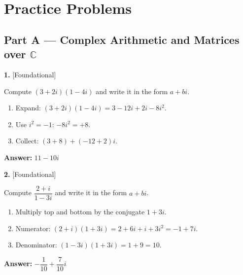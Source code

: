 \documentclass[11pt]{article}
\begin{document}
\section*{\large\color{ink} Practice Problems}
\subsection*{\normalsize\color{ink} Part A --- Complex Arithmetic and Matrices over $\mathbb{C}$}
\begin{minipage}{\linewidth}\textbf{1.} \hfill{\scriptsize\color{ink}[Foundational]}\par\nopagebreak Compute $(3+2i)(1-4i)$ and write it in the form $a+bi$.
\end{minipage}\par\nopagebreak
\begin{tcolorbox}[breakable,colback=ans,colframe=ansb,boxrule=0.5pt,left=4pt,right=4pt,top=2pt,bottom=2pt]\begin{enumerate}[leftmargin=2.2em,itemsep=1pt,topsep=1pt,label=\textbf{Step \arabic*.}]\item Expand: $(3+2i)(1-4i)=3-12i+2i-8i^{2}$.
\item Use $i^{2}=-1$: $-8i^{2}=+8$.
\item Collect: $(3+8)+(-12+2)i$.
\end{enumerate}\textbf{Answer:} $11-10i$\end{tcolorbox}
\par\vspace{2pt}
\begin{minipage}{\linewidth}\textbf{2.} \hfill{\scriptsize\color{ink}[Foundational]}\par\nopagebreak Compute $\dfrac{2+i}{1-3i}$ and write it in the form $a+bi$.
\end{minipage}\par\nopagebreak
\begin{tcolorbox}[breakable,colback=ans,colframe=ansb,boxrule=0.5pt,left=4pt,right=4pt,top=2pt,bottom=2pt]\begin{enumerate}[leftmargin=2.2em,itemsep=1pt,topsep=1pt,label=\textbf{Step \arabic*.}]\item Multiply top and bottom by the conjugate $1+3i$.
\item Numerator: $(2+i)(1+3i)=2+6i+i+3i^{2}=-1+7i$.
\item Denominator: $(1-3i)(1+3i)=1+9=10$.
\end{enumerate}\textbf{Answer:} $-\dfrac{1}{10}+\dfrac{7}{10}i$\end{tcolorbox}
\end{document}
